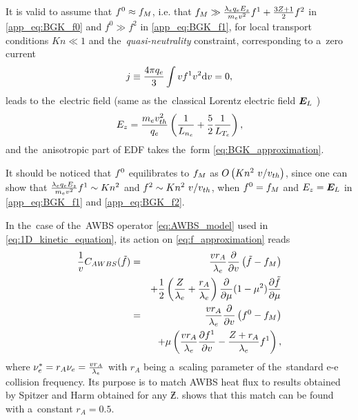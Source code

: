 It is valid to assume that $f^0 \approx f_M$, i.e. that $f_M \gg
\frac{\lambda_eq_eE_z}{m_ev^2}f^1 + \frac{3Z + 1}{2}f^2$ 
in \eqref{app_eq:BGK_f0} and $f^0\gg f^2$ in \eqref{app_eq:BGK_f1}, 
for local transport conditions 
$Kn\ll1$ and the~\textit{quasi-neutrality} constraint, corresponding to 
a~zero current
\begin{equation}
j \equiv \frac{4\pi q_e}{3} \int v f^1 v^2 \text{d}v = 0 ,
\end{equation}
leads to the~electric field (same as the~classical Lorentz electric field
$\boldsymbol{E}_L$ \cite{Lorentz_1905})
\begin{equation}
  E_z = \frac{m_ev_{th}^2}{q_e}\left(\frac{1}{L_{n_e}} 
  + \frac{5}{2}\frac{1}{L_{T_e}} \right) 
  ,
  \label{app_eq:BGK_Efield}
\end{equation}
and the~anisotropic part of EDF takes the~form \eqref{eq:BGK_approximation}.

It should be noticed that $f^0$ equilibrates to $f_M$ 
as $O\left( Kn^2~v/v_{th} \right)$, since one can show that
$\frac{\lambda_eq_eE_z}{m_ev^2}f^1 \sim Kn^2$ and  
$f^2 \sim Kn^2~v/v_{th}$, when $f^0 = f_M$ and $E_z=\boldsymbol{E}_L$ in 
\eqref{app_eq:BGK_f1} and \eqref{app_eq:BGK_f2}.

In the~case of the~AWBS operator \eqref{eq:AWBS_model} used in 
\eqref{eq:1D_kinetic_equation}, its action on \eqref{eq:f_approximation} reads
\begin{eqnarray}
  \frac{1}{v}C_{AWBS}(\tilde{f})
  &=& 
  \frac{v r_A}{\lambda_e} \frac{\partial{}}{\partial{v}}\left(\tilde{f} - f_M\right) 
  \nonumber \\
  && + \frac{1}{2}\left(\frac{Z}{\lambda_e} + \frac{r_A}{\lambda_e}\right)
  \frac{\partial{}}{\partial{\mu}}(1 - \mu^2)\frac{\partial{\tilde{f}}}{\partial{\mu}}  \nonumber \\
  &=& \frac{v r_A}{\lambda_e} \frac{\partial{}}{\partial{v}}\left(f^0 - f_M\right) \nonumber \\ 
  &&\, + \mu\left(\frac{v r_A}{\lambda_e} \frac{\partial{f^1}}{\partial{v}} 
  - \frac{Z+r_A}{\lambda_e}f^1\right) ,
  \label{app_eq:AWBS_model_1D}
\end{eqnarray}
where $\nu_{e}^* = r_A \nu_{e} = \frac{v r_A}{\lambda_e}$ with $r_A$ being a~scaling
parameter of the~standard e-e collision frequency. Its purpose is to
match AWBS heat flux to results obtained by Spitzer and Harm 
\cite{SpitzerHarm_PR1953} obtained for any $\Zbar$. 
 shows that this match can be found with 
a~constant $r_A=0.5$.

